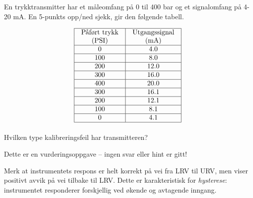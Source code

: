 


En trykktransmitter har et måleomfang på 0 til 400 bar og et signalomfang på 4-20 mA. En 5-punkts opp/ned sjekk, gir den følgende tabell. 


$$\vbox{\offinterlineskip
\halign{\strut
\vrule \quad\hfil # \ \hfil & 
\vrule \quad\hfil # \ \hfil \vrule \cr
\noalign{\hrule}
%
Påført trykk & Utgangssignal \cr
%
(PSI) & (mA) \cr
%
\noalign{\hrule}
%
0 & 4.0 \cr
%
\noalign{\hrule}
%
100 & 8.0 \cr
%
\noalign{\hrule}
%
200 & 12.0 \cr
%
\noalign{\hrule}
%
300 & 16.0 \cr
%
\noalign{\hrule}
%
400 & 20.0 \cr
%
\noalign{\hrule}
%
300 & 16.1 \cr
%
\noalign{\hrule}
%
200 & 12.1 \cr
%
\noalign{\hrule}
%
100 & 8.1 \cr
%
\noalign{\hrule}
%
0 & 4.1 \cr
%
\noalign{\hrule}
} %
}$$ %

\vskip 10pt

Hvilken type kalibreringsfeil har transmitteren?

\vfil 

\eject






Dette er en vurderingsoppgave -- ingen svar eller hint er gitt!







Merk at instrumentets respons er helt korrekt på vei fra LRV til URV, men viser positivt avvik på vei tilbake til LRV. Dette er karakteristisk for {\it hysterese}: instrumentet responderer forskjellig ved økende og avtagende inngang.



